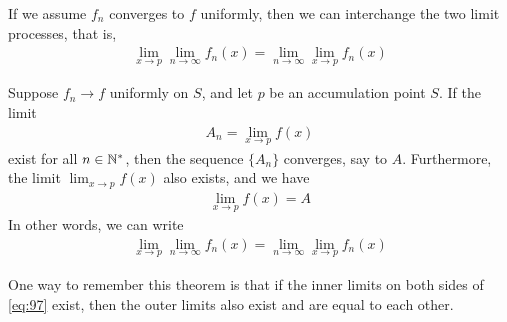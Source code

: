 \documentclass[thmcnt=section, 12pt]{my-elegantbook}
\begin{document}

If we assume $f_n$ converges to $f$ uniformly, then we can interchange the two limit processes, that is,
\begin{align*}
    \lim_{x \to p} \lim_{n \to \infty} f_n(x)
    = \lim_{n \to \infty} \lim_{x \to p} f_n(x)
\end{align*}

\begin{theorem} \label{thm:43}
    Suppose $f_n \to f$ uniformly on $S$, and let $p$ be an accumulation point $S$. If the limit
    \begin{align*}
        A_n = \lim_{x \to p} f(x)
    \end{align*}
    exist for all $n \in \mathbb{N}^\ast$, then the sequence $\{A_n\}$ converges, say to $A$. Furthermore, the limit $\lim_{x \to p}f(x)$ also exists, and we have
    \begin{align*}
        \lim_{x \to p}f(x) = A
    \end{align*}
    In other words, we can write
    \begin{align}
        \lim_{x \to p} \lim_{n \to \infty} f_n(x)
        = \lim_{n \to \infty} \lim_{x \to p} f_n(x)
        \label{eq:97}
    \end{align}
\end{theorem}

\begin{note}
    One way to remember this theorem is that if the inner limits on both sides of \eqref{eq:97} exist, then the outer limits also exist and are equal to each other.
\end{note}
\end{document}
